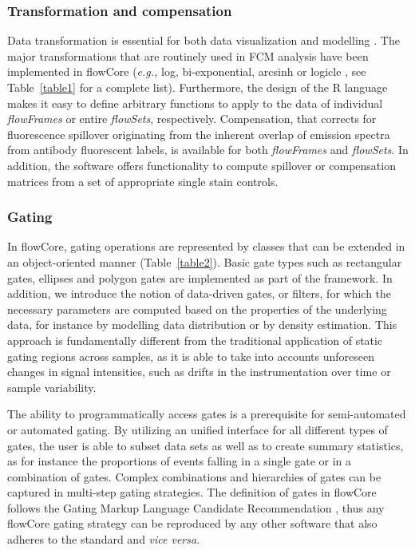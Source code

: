 \documentclass[10pt]{bmc_article}
\newcommand{\Rpackage}[1]{{\textsf{#1}}}
\newcommand{\Rclass}[1]{{\textit{#1}}}
\newenvironment{bmcformat}{\begin{raggedright}\baselineskip20pt\sloppy\setboolean{publ}{false}}{\end{raggedright}\baselineskip20pt\sloppy}
\begin{document}
\begin{bmcformat}
\subsubsection*{Transformation and compensation}
Data transformation is essential for both data visualization and
modelling \cite{lo2008agf}. The major transformations that are
routinely used in FCM analysis have been implemented in
\Rpackage{flowCore} (\textit{e.g.,} log, bi-exponential, arcsinh or
logicle \cite{Parks:2006}, see Table~\ref{table1} for a complete
list). Furthermore, the design of the R language makes it easy to
define arbitrary functions to apply to the data of individual
\Rclass{flowFrames} or entire \Rclass{flowSets},
respectively. Compensation, that corrects for fluorescence spillover
originating from the inherent overlap of emission spectra from
antibody fluorescent labels, is available for both \Rclass{flowFrames}
and \Rclass{flowSets}. In addition, the software offers functionality
to compute spillover or compensation matrices from a set of
appropriate single stain controls.


\subsubsection*{Gating}
In \Rpackage{flowCore}, gating operations are represented by classes
that can be extended in an object-oriented manner
(Table~\ref{table2}). Basic gate types such as rectangular gates,
ellipses and polygon gates are implemented as part of the
framework. In addition, we introduce the notion of data-driven gates,
or filters, for which the necessary parameters are computed based on
the properties of the underlying data, for instance by modelling data
distribution or by density estimation. This approach is fundamentally
different from the traditional application of static gating regions
across samples, as it is able to take into accounts unforeseen changes
in signal intensities, such as drifts in the instrumentation
over time or sample variability.

The ability to programmatically access gates is a prerequisite for
semi-automated or automated gating. By utilizing an unified interface
for all different types of gates, the user is able to subset data sets
as well as to create summary statistics, as for instance the
proportions of events falling in a single gate or in a combination of
gates. Complex combinations and hierarchies of gates can be captured
in multi-step gating strategies. The definition of gates in
\Rpackage{flowCore} follows the Gating Markup Language Candidate
Recommendation \cite{SpidlenInPressCytometryA}, thus any
\Rpackage{flowCore} gating strategy can be reproduced by any other
software that also adheres to the standard and \textit{vice versa}.


\end{bmcformat}
\end{document}
